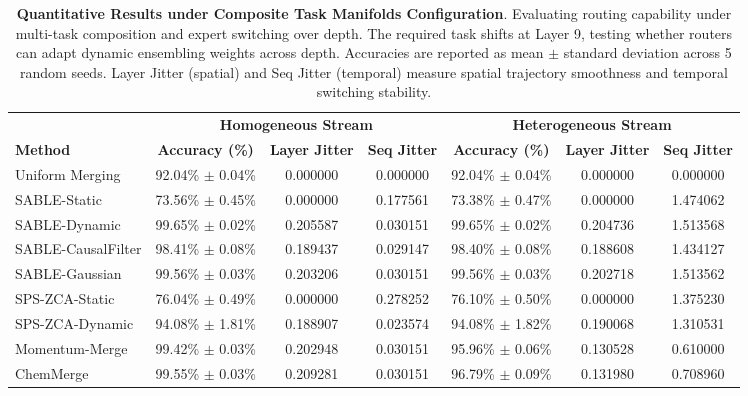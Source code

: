 \begin{table}[t]
\caption{\textbf{Quantitative Results under Composite Task Manifolds Configuration}. Evaluating routing capability under multi-task composition and expert switching over depth. The required task shifts at Layer 9, testing whether routers can adapt dynamic ensembling weights across depth. Accuracies are reported as mean $\pm$ standard deviation across 5 random seeds. Layer Jitter (spatial) and Seq Jitter (temporal) measure spatial trajectory smoothness and temporal switching stability.}
\label{tab:composite_results}
\vskip 0.15in
\begin{center}
\setlength{\tabcolsep}{4.0pt}
\begin{small}
\begin{sc}
\begin{tabular}{lcccccc}
\toprule
 & \multicolumn{3}{c}{\textbf{Homogeneous Stream}} & \multicolumn{3}{c}{\textbf{Heterogeneous Stream}} \\
\cmidrule(r){2-4} \cmidrule(l){5-7}
\textbf{Method} & \textbf{Accuracy (\%)} & \textbf{Layer Jitter} & \textbf{Seq Jitter} & \textbf{Accuracy (\%)} & \textbf{Layer Jitter} & \textbf{Seq Jitter} \\
\midrule
Uniform Merging   & 92.04\% $\pm$ 0.04\% & 0.000000 & 0.000000 & 92.04\% $\pm$ 0.04\% & 0.000000 & 0.000000 \\
SABLE-Static      & 73.56\% $\pm$ 0.45\% & 0.000000 & 0.177561 & 73.38\% $\pm$ 0.47\% & 0.000000 & 1.474062 \\
SABLE-Dynamic     & 99.65\% $\pm$ 0.02\% & 0.205587 & 0.030151 & 99.65\% $\pm$ 0.02\% & 0.204736 & 1.513568 \\
SABLE-CausalFilter & 98.41\% $\pm$ 0.08\% & 0.189437 & 0.029147 & 98.40\% $\pm$ 0.08\% & 0.188608 & 1.434127 \\
SABLE-Gaussian    & 99.56\% $\pm$ 0.03\% & 0.203206 & 0.030151 & 99.56\% $\pm$ 0.03\% & 0.202718 & 1.513562 \\
SPS-ZCA-Static    & 76.04\% $\pm$ 0.49\% & 0.000000 & 0.278252 & 76.10\% $\pm$ 0.50\% & 0.000000 & 1.375230 \\
SPS-ZCA-Dynamic   & 94.08\% $\pm$ 1.81\% & 0.188907 & 0.023574 & 94.08\% $\pm$ 1.82\% & 0.190068 & 1.310531 \\
Momentum-Merge    & 99.42\% $\pm$ 0.03\% & 0.202948 & 0.030151 & 95.96\% $\pm$ 0.06\% & 0.130528 & 0.610000 \\
ChemMerge         & 99.55\% $\pm$ 0.03\% & 0.209281 & 0.030151 & 96.79\% $\pm$ 0.09\% & 0.131980 & 0.708960 \\

\end{tabular}
\end{sc}
\end{small}
\end{center}
\end{table}
